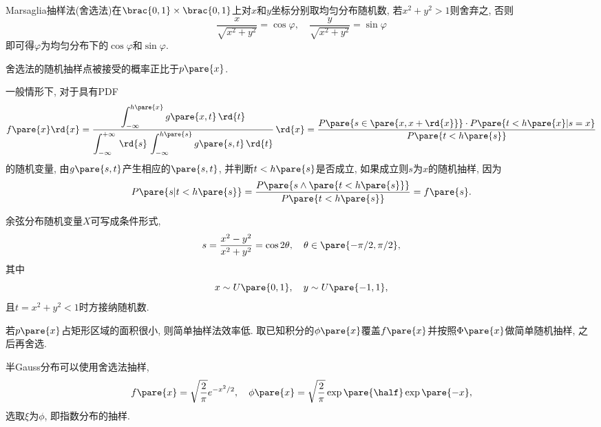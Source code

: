 \documentclass[hidelinks]{ctexart}
\begin{document}
Marsaglia抽样法(舍选法)在$\brac{0,1}\times \brac{0,1}$上对$x$和$y$坐标分别取均匀分布随机数, 若$x^2+y^2 >1$则舍弃之, 否则
\[ \frac{x}{\sqrt{x^2+y^2}} = \cos\varphi, \quad \frac{y}{\sqrt{x^2+y^2}} = \sin\varphi \]
即可得$\varphi$为均匀分布下的$\cos\varphi$和$\sin\varphi$.
\par
舍选法的随机抽样点被接受的概率正比于$p\pare{x}$.
\par
一般情形下, 对于具有PDF
\[ f\pare{x} \rd{x} = \frac{\displaystyle \int_{-\infty}^{h\pare{x}} g\pare{x,t}\,\rd{t}}{\displaystyle \int_{-\infty}^{+\infty}\,\rd{s}\,\int_{-\infty}^{h\pare{s}} g\pare{s,t}\,\rd{t}}\,\rd{x} = \frac{P\pare{s\in \pare{x,x+\rd{x}}}\cdot P\pare{t<h\pare{x}\vert s=x}}{P\pare{t<h\pare{s}}} \]
的随机变量, 由$g\pare{s,t}$产生相应的$\pare{s,t}$, 并判断$t < h\pare{s}$是否成立, 如果成立则$s$为$x$的随机抽样, 因为
\[ P\pare{s|t<h\pare{s}} = \frac{P\pare{s \land \pare{t<h\pare{s}}}}{P\pare{t<h\pare{s}}} = f\pare{s}. \]
\begin{sample}
    \begin{ex}
        余弦分布随机变量$X$可写成条件形式,
        \[ s = \frac{x^2 - y^2}{x^2 + y^2} = \cos 2\theta,\quad \theta \in \pare{-\pi/2,\pi/2}, \]
        其中
        \[ x \sim U\pare{0,1},\quad y \sim U\pare{-1,1}, \]
        且$t = x^2 + y^2 < 1$时方接纳随机数.
    \end{ex}
\end{sample}
若$p\pare{x}$占矩形区域的面积很小, 则简单抽样法效率低. 取已知积分的$\phi\pare{x}$覆盖$f\pare{x}$并按照$\Phi\pare{x}$做简单随机抽样, 之后再舍选.
\par
\begin{sample}
    \begin{ex}
        半Gauss分布可以使用舍选法抽样,
        \[ f\pare{x} = \sqrt{\frac{2}{\pi}}e^{-x^2/2},\quad \phi\pare{x} = \sqrt{\frac{2}{\pi}}\exp\pare{\half}\exp\pare{-x}, \]
        选取$\xi$为$\phi$, 即指数分布的抽样.
    \end{ex}
\end{sample}




\end{document}
